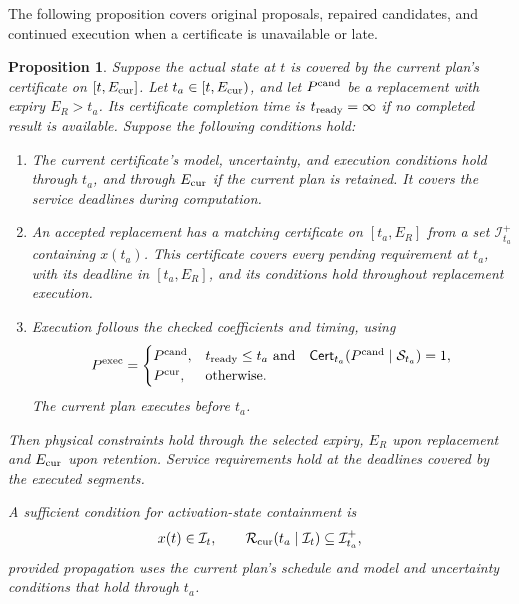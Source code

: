 \documentclass[preprint,12pt]{elsarticle}
\theoremstyle{definition}
\theoremstyle{plain}
\newtheorem{proposition}{Proposition}
\theoremstyle{definition}
\theoremstyle{plain}
\begin{document}
The following proposition covers original proposals, repaired candidates,
and continued execution when a certificate is unavailable or late.

\begin{proposition}
\label{prop:repair-execution}
\label{prop:planned-handover}
Suppose the actual state at $t$ is covered by the current plan's
certificate on $[t,E_{\rm cur}]$. Let $t_a\in[t,E_{\rm cur})$, and let
$P^{\rm cand}$ be a replacement with expiry $E_R>t_a$. Its certificate
completion time is $t_{\rm ready}=\infty$ if no completed result is
available. Suppose the following conditions hold:
\begin{enumerate}
\item The current certificate's model, uncertainty, and execution
conditions hold through $t_a$, and through $E_{\rm cur}$ if the current
plan is retained. It covers the service deadlines during computation.
\item An accepted replacement has a matching certificate on $[t_a,E_R]$
from a set $\mathcal I_{t_a}^+$ containing $x(t_a)$. This certificate
covers every pending requirement at $t_a$, with its deadline in
$[t_a,E_R]$, and its conditions hold throughout replacement execution.
\item Execution follows the checked coefficients and timing, using
\begin{equation}
P^{\rm exec}=\begin{cases}
P^{\rm cand},&t_{\rm ready}\le t_a\ \text{and}\quad
 \mathsf{Cert}_{t_a}(P^{\rm cand}\mid\mathcal S_{t_a})=1,\\
P^{\rm cur},&\text{otherwise}.
\end{cases}
\label{eq:repair-installation-rule}
\end{equation}
The current plan executes before $t_a$.
\end{enumerate}
Then physical constraints hold through the selected expiry, $E_R$ upon
replacement and $E_{\rm cur}$ upon retention. Service requirements hold
at the deadlines covered by the executed segments.

A sufficient condition for activation-state containment is
\[
x(t)\in\mathcal I_t,\qquad
\mathcal R_{\rm cur}(t_a\mid\mathcal I_t)
 \subseteq\mathcal I_{t_a}^+,
\]
provided propagation uses the current plan's schedule and model and
uncertainty conditions that hold through $t_a$.
\end{proposition}
\end{document}
